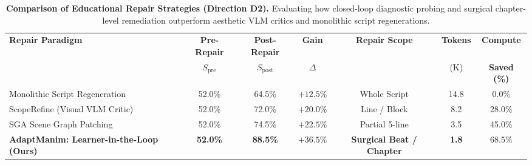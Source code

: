 \begin{table}[t]
\centering
\small
\caption{\textbf{Comparison of Educational Repair Strategies (Direction D2).} 
Evaluating how closed-loop diagnostic probing and surgical chapter-level remediation outperform aesthetic VLM critics and monolithic script regenerations.}
\label{tab:learner_in_the_loop_repair}
\begin{tabular}{lcccccc}
\toprule
\textbf{Repair Paradigm} & \textbf{Pre-Repair} & \textbf{Post-Repair} & \textbf{Gain} & \textbf{Repair Scope} & \textbf{Tokens} & \textbf{Compute} \\
& $S_{\text{pre}}$ & $S_{\text{post}}$ & $\Delta$ & & (K) & \textbf{Saved (\%)} \\
\midrule
Monolithic Script Regeneration & 52.0\% & 64.5\% & $+12.5\%$ & Whole Script & 14.8 & 0.0\% \\
ScopeRefine (Visual VLM Critic) & 52.0\% & 72.0\% & $+20.0\%$ & Line / Block & 8.2 & 28.0\% \\
SGA Scene Graph Patching & 52.0\% & 74.5\% & $+22.5\%$ & Partial 5-line & 3.5 & 45.0\% \\
\midrule
\textbf{AdaptManim: Learner-in-the-Loop (Ours)} & \textbf{52.0\%} & \textbf{88.5\%} & $\mathbf{+36.5\%}$ & \textbf{Surgical Beat / Chapter} & \textbf{1.8} & $\mathbf{68.5\%}$ \\
\bottomrule
\end{tabular}
\end{table}
